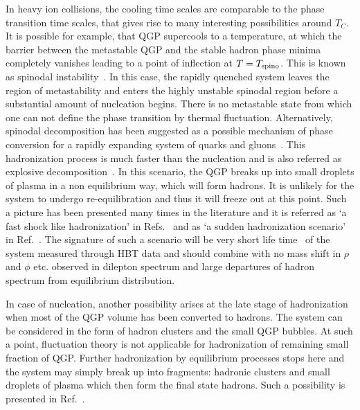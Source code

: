   In heavy ion collisions, the cooling time scales are comparable
to the phase transition time scales, that gives rise to many
interesting possibilities around $T_C$.
  It is possible for example, that QGP supercools to a temperature, 
at which the barrier between the metastable QGP and the stable hadron phase 
minima completely vanishes leading to a point of inflection at 
$T=T_{\rm spino}$. This is known as 
spinodal instability~\cite{SPINO}. In this case, the rapidly quenched 
system leaves the region of metastability and enters the highly unstable 
spinodal region before a substantial amount of nucleation begins.
There is no metastable state from which one can not define the phase 
transition by thermal fluctuation.
   Alternatively, spinodal decomposition has been suggested as a
possible mechanism of phase conversion for a rapidly expanding system of 
quarks and gluons~\cite{SPINO,DUMHEP,DUMPRL}. This hadronization process
is much faster than the nucleation and is  
also referred as explosive decomposition~\cite{DUMEXP}.
 In this scenario, the QGP breaks up into small droplets of plasma in
a non equilibrium way, which will form hadrons. It is unlikely for the 
system to undergo re-equilibration and thus it will freeze out at this point. 
  Such a picture has been presented many times in the literature
and it is referred as `a fast shock like hadronization' in 
Refs.~\cite{CSORGO} and as `a sudden hadronization scenario' in 
Ref.~\cite{RAFEL}.
  The signature of such a scenario will be very short life 
time~\cite{CSERNAI} of the system measured through HBT data
and should combine with no mass shift in $\rho$ and $\phi$ etc.
observed in dilepton spectrum and large departures of hadron spectrum
from equilibrium distribution.

  In case of nucleation, another possibility arises at the late stage of 
hadronization when most of the QGP volume has been converted to hadrons.
  The system can be considered in the form of hadron clusters and the small 
QGP bubbles. At such a point, fluctuation theory is not applicable for 
hadronization of remaining small fraction of QGP. Further hadronization by 
equilibrium processes stops here and the system may simply break up into 
fragments: hadronic clusters and small droplets of plasma which then form 
the final state hadrons. Such a possibility is presented
in Ref.~\cite{ZABPRC}. 

